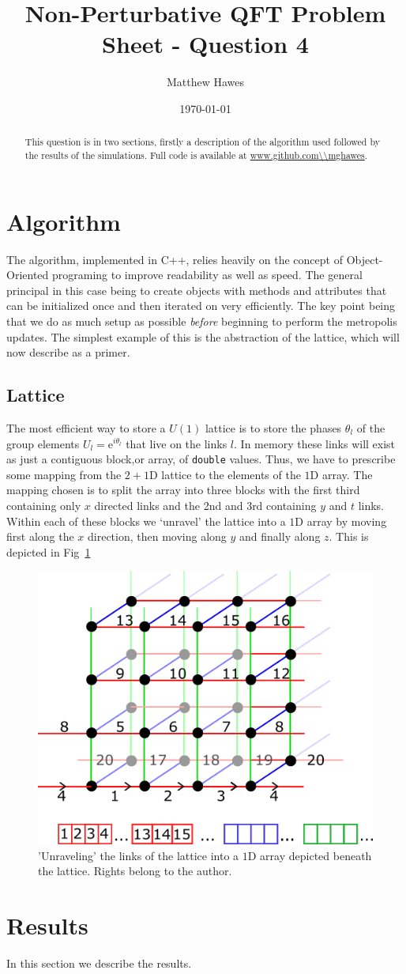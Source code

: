 \documentclass[12pt]{article}
\title{Non-Perturbative QFT Problem Sheet - Question 4}
\author{Matthew Hawes}
\date{\today}
\begin{document}
\maketitle

\begin{abstract}
This question is in two sections, firstly a description of the algorithm used followed by the results of the simulations. Full code is available at \url{www.github.com\\mghawes}.
\end{abstract}

\section{Algorithm}
The algorithm, implemented in C++, relies heavily on the concept of Object-Oriented programing to improve readability as well as speed. The general principal in this case being to create objects with methods and attributes that can be initialized once and then iterated on very efficiently. The key point being that we do as much setup as possible \emph{before} beginning to perform the metropolis updates. The simplest example of this is the abstraction of the lattice, which will now describe as a primer.

\subsection{Lattice}
The most efficient way to store a $U(1)$ lattice is to store the phases $\theta_l$ of the group elements $U_l = \mathrm{e}^{i\theta_l}$ that live on the links $l$. In memory these links will exist as just a contiguous block,or array, of \texttt{double} values. Thus, we have to prescribe some mapping from the $2+1\mathrm{D}$ lattice to the elements of the $1\mathrm{D}$ array. The mapping chosen is to split the array into three blocks with the first third containing only $x$ directed links and the 2nd and 3rd containing $y$ and $t$ links. Within each of these blocks we `unravel' the lattice into a $1\mathrm{D}$ array by moving first along the $x$ direction, then moving along $y$ and finally along $z$. This is depicted in Fig~\ref{fig:latticeunpack}


\begin{figure}
\centering
\includegraphics[width=0.6\linewidth]{latticeunpack.png}
\caption{'Unraveling' the links of the lattice into a $1\mathrm{D}$ array depicted beneath the lattice. Rights belong to the author.}
\label{fig:latticeunpack}
\end{figure}


\section{Results}
In this section we describe the results.
\end{document}
